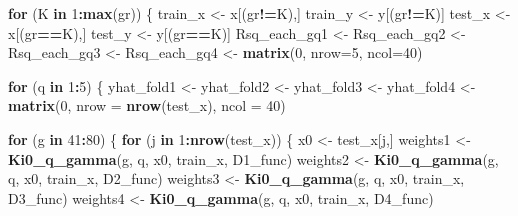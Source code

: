 \documentclass[
]{article}
\newenvironment{Shaded}{\begin{snugshade}}{\end{snugshade}}
\newcommand{\AttributeTok}[1]{\textcolor[rgb]{0.13,0.29,0.53}{#1}}
\newcommand{\ControlFlowTok}[1]{\textcolor[rgb]{0.13,0.29,0.53}{\textbf{#1}}}
\newcommand{\DecValTok}[1]{\textcolor[rgb]{0.00,0.00,0.81}{#1}}
\newcommand{\FunctionTok}[1]{\textcolor[rgb]{0.13,0.29,0.53}{\textbf{#1}}}
\newcommand{\NormalTok}[1]{#1}
\newcommand{\OtherTok}[1]{\textcolor[rgb]{0.56,0.35,0.01}{#1}}
\newcommand{\SpecialCharTok}[1]{\textcolor[rgb]{0.81,0.36,0.00}{\textbf{#1}}}
\begin{document}
\begin{Shaded}
\begin{Highlighting}[]
  \ControlFlowTok{for}\NormalTok{ (K }\ControlFlowTok{in} \DecValTok{1}\SpecialCharTok{:}\FunctionTok{max}\NormalTok{(gr)) \{}
\NormalTok{    train\_x }\OtherTok{\textless{}{-}}\NormalTok{ x[(gr}\SpecialCharTok{!=}\NormalTok{K),]}
\NormalTok{    train\_y }\OtherTok{\textless{}{-}}\NormalTok{ y[(gr}\SpecialCharTok{!=}\NormalTok{K)]}
\NormalTok{    test\_x }\OtherTok{\textless{}{-}}\NormalTok{ x[(gr}\SpecialCharTok{==}\NormalTok{K),]}
\NormalTok{    test\_y }\OtherTok{\textless{}{-}}\NormalTok{ y[(gr}\SpecialCharTok{==}\NormalTok{K)]}
\NormalTok{    Rsq\_each\_gq1 }\OtherTok{\textless{}{-}}\NormalTok{ Rsq\_each\_gq2 }\OtherTok{\textless{}{-}}\NormalTok{ Rsq\_each\_gq3 }\OtherTok{\textless{}{-}}\NormalTok{ Rsq\_each\_gq4 }\OtherTok{\textless{}{-}} 
      \FunctionTok{matrix}\NormalTok{(}\DecValTok{0}\NormalTok{, }\AttributeTok{nrow=}\DecValTok{5}\NormalTok{, }\AttributeTok{ncol=}\DecValTok{40}\NormalTok{)}
    
    \ControlFlowTok{for}\NormalTok{ (q }\ControlFlowTok{in} \DecValTok{1}\SpecialCharTok{:}\DecValTok{5}\NormalTok{) \{}
\NormalTok{      yhat\_fold1 }\OtherTok{\textless{}{-}}\NormalTok{ yhat\_fold2 }\OtherTok{\textless{}{-}}\NormalTok{ yhat\_fold3 }\OtherTok{\textless{}{-}}\NormalTok{ yhat\_fold4 }\OtherTok{\textless{}{-}}
        \FunctionTok{matrix}\NormalTok{(}\DecValTok{0}\NormalTok{, }\AttributeTok{nrow =} \FunctionTok{nrow}\NormalTok{(test\_x), }\AttributeTok{ncol =} \DecValTok{40}\NormalTok{)}
      
      \ControlFlowTok{for}\NormalTok{ (g }\ControlFlowTok{in} \DecValTok{41}\SpecialCharTok{:}\DecValTok{80}\NormalTok{) \{}
        \ControlFlowTok{for}\NormalTok{ (j }\ControlFlowTok{in} \DecValTok{1}\SpecialCharTok{:}\FunctionTok{nrow}\NormalTok{(test\_x)) \{}
\NormalTok{          x0 }\OtherTok{\textless{}{-}}\NormalTok{ test\_x[j,]}
\NormalTok{          weights1 }\OtherTok{\textless{}{-}} \FunctionTok{Ki0\_q\_gamma}\NormalTok{(g, q, x0, train\_x, D1\_func)}
\NormalTok{          weights2 }\OtherTok{\textless{}{-}} \FunctionTok{Ki0\_q\_gamma}\NormalTok{(g, q, x0, train\_x, D2\_func)}
\NormalTok{          weights3 }\OtherTok{\textless{}{-}} \FunctionTok{Ki0\_q\_gamma}\NormalTok{(g, q, x0, train\_x, D3\_func)}
\NormalTok{          weights4 }\OtherTok{\textless{}{-}} \FunctionTok{Ki0\_q\_gamma}\NormalTok{(g, q, x0, train\_x, D4\_func)}
          

\end{Highlighting}
\end{Shaded}
\end{document}
